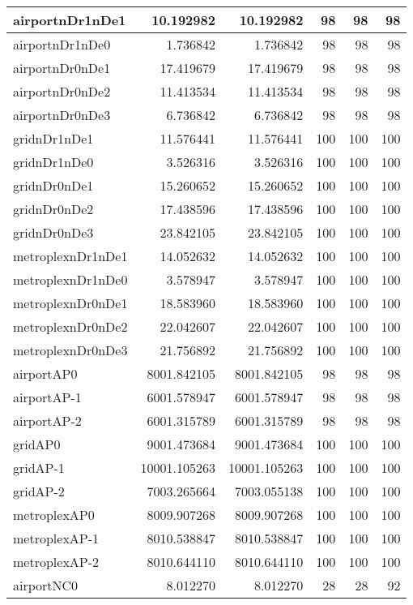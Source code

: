 \begin{longtable}{|l|r|r|r|r|r|}
\endlastfoot
airportnDr1nDe1 & 10.192982 & 10.192982 & 98 & 98 & 98 \\ \hline
airportnDr1nDe0 & 1.736842 & 1.736842 & 98 & 98 & 98 \\ \hline
airportnDr0nDe1 & 17.419679 & 17.419679 & 98 & 98 & 98 \\ \hline
airportnDr0nDe2 & 11.413534 & 11.413534 & 98 & 98 & 98 \\ \hline
airportnDr0nDe3 & 6.736842 & 6.736842 & 98 & 98 & 98 \\ \hline
gridnDr1nDe1 & 11.576441 & 11.576441 & 100 & 100 & 100 \\ \hline
gridnDr1nDe0 & 3.526316 & 3.526316 & 100 & 100 & 100 \\ \hline
gridnDr0nDe1 & 15.260652 & 15.260652 & 100 & 100 & 100 \\ \hline
gridnDr0nDe2 & 17.438596 & 17.438596 & 100 & 100 & 100 \\ \hline
gridnDr0nDe3 & 23.842105 & 23.842105 & 100 & 100 & 100 \\ \hline
metroplexnDr1nDe1 & 14.052632 & 14.052632 & 100 & 100 & 100 \\ \hline
metroplexnDr1nDe0 & 3.578947 & 3.578947 & 100 & 100 & 100 \\ \hline
metroplexnDr0nDe1 & 18.583960 & 18.583960 & 100 & 100 & 100 \\ \hline
metroplexnDr0nDe2 & 22.042607 & 22.042607 & 100 & 100 & 100 \\ \hline
metroplexnDr0nDe3 & 21.756892 & 21.756892 & 100 & 100 & 100 \\ \hline
airportAP0 & 8001.842105 & 8001.842105 & 98 & 98 & 98 \\ \hline
airportAP-1 & 6001.578947 & 6001.578947 & 98 & 98 & 98 \\ \hline
airportAP-2 & 6001.315789 & 6001.315789 & 98 & 98 & 98 \\ \hline
gridAP0 & 9001.473684 & 9001.473684 & 100 & 100 & 100 \\ \hline
gridAP-1 & 10001.105263 & 10001.105263 & 100 & 100 & 100 \\ \hline
gridAP-2 & 7003.265664 & 7003.055138 & 100 & 100 & 100 \\ \hline
metroplexAP0 & 8009.907268 & 8009.907268 & 100 & 100 & 100 \\ \hline
metroplexAP-1 & 8010.538847 & 8010.538847 & 100 & 100 & 100 \\ \hline
metroplexAP-2 & 8010.644110 & 8010.644110 & 100 & 100 & 100 \\ \hline
airportNC0 & 8.012270 & 8.012270 & 28 & 28 & 92 \\ \hline

\end{longtable}
